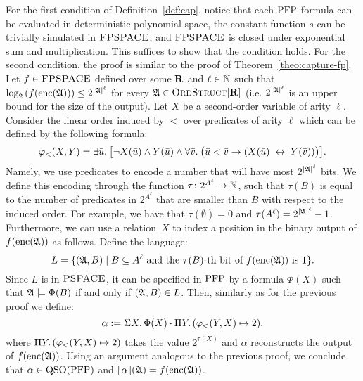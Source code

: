 
For the first condition of Definition~\ref{def:cap}, notice that each ${\rm PFP}$ formula can be evaluated in deterministic polynomial space, the constant function $s$ can be trivially simulated in $\text{\sc FPSPACE}$, and $\text{\sc FPSPACE}$ is closed under exponential sum and multiplication. This suffices to show that the condition holds.
For the second condition, the proof is similar to the proof of Theorem~\ref{theo:capture-fp}. Let $f\in \text{\sc FPSPACE}$ defined over some $\mathbf{R}$ and $\ell\in\mathbb{N}$ such that $\log_2\left( f({\rm enc}(\mathfrak{A})) \right) \leq 2^{{|\mathfrak{A}|}^\ell}$ for every $\mathfrak{A}\in\text{\sc OrdStruct}[\mathbf{R}]$  (i.e. $2^{{|\mathfrak{A}|}^\ell}$ is an upper bound for the size of the output). Let $X$ be a second-order variable of arity $\ell$. Consider the linear order induced by $<$ over predicates of arity $\ell$ which can be defined by the following formula:
$$
\varphi_{<}(X,Y) = \exists{\bar{u}}.\:\big[\neg X(\bar{u})\wedge Y(\bar{u})\wedge \forall{\bar{v}}.\:\big(
\bar{u}<\bar{v}\to(X(\bar{u})\;\leftrightarrow\; Y(\bar{v}))\big)\big].
$$
Namely, we use predicates to encode a number that will have most $2^{{|\mathfrak{A}|}^\ell}$ bits. We define this encoding through the function $\tau\colon 2^{A^\ell}\to\mathbb{N}$, such that $\tau(B)$ is equal to the number of predicates in $2^{A^\ell}$ that are smaller than $B$ with respect to the induced order. For example, we have that $\tau(\emptyset) = 0$ and $\tau(A^{\ell}) = 2^{{|\mathfrak{A}|}^\ell}-1$. Furthermore, we can use a relation~$X$ to index a position in the binary output of $f({\rm enc}(\mathfrak{A}))$ as follows.
Define the language:
\[
L = \{(\mathfrak{A},B)\mid B \subseteq A^{\ell}\text{ and the $\tau(B)$-th bit of $f({\rm enc}(\mathfrak{A}))$ is 1}\}.
\]
Since $L$ is in $\text{\sc PSPACE}$, it can be specified in ${\rm PFP}$ \cite{AbiteboulV89} by a formula $\Phi(X)$ such that $\mathfrak{A}\models\Phi(B)$ if and only if $(\mathfrak{A},B)\in L$. Then, similarly as for the previous proof we define:
$$
\alpha := \Sigma{X}.\, \Phi(X)\cdot  \Pi{Y}.\,(\varphi_{<}(Y,X)\mapsto 2).
$$ 
where $\Pi{Y}.\,(\varphi_{<}(Y,X)\mapsto 2)$ takes the value $2^{\tau(X)}$ and $\alpha$ reconstructs the output of $f({\rm enc}(\mathfrak{A}))$. Using an argument analogous to the previous proof, we conclude that $\alpha\in{\rm QSO}({\rm PFP})$ and ${\llbracket{}{\alpha}\rrbracket}(\mathfrak{A}) = f({\rm enc}(\mathfrak{A}))$.
